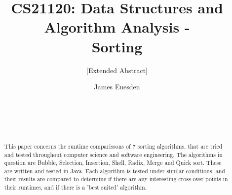 \documentclass{acm_proc_article-sp}
\begin{document}
\title{CS21120: Data Structures and Algorithm Analysis - \\
Sorting}
\subtitle{[Extended Abstract]}
%
%
%
%
%

%
\author{
%
%
\alignauthor
James Euesden\\
       \\
       \\
       \\
       \\
}

\maketitle
\begin{abstract}
This paper concerns the runtime comparissons of
7 sorting algorithms, that are tried and tested
throughout computer science and software engineering.
The algorithms in question are Bubble, Selection, Insertion,
Shell, Radix, Merge and Quick sort. These are
written and tested in Java. Each algorithm is tested under
similar conditions, and their results are compared to
determine if there are any interesting cross-over points
in their runtimes, and if there is a 'best suited' algorithm.
\end{abstract}
\end{document}
